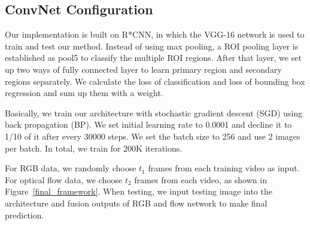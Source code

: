 \documentclass[10pt,twocolumn,letterpaper]{article}
\begin{document}
\subsection{ConvNet Configuration}
Our implementation is built on R*CNN, in which the VGG-16 network is used to train and test our method. Instead of using max pooling, a ROI pooling layer is established as pool5 to classify the multiple ROI regions. After that layer, we set up two ways of fully connected layer to learn primary region and secondary regions separately. We calculate the loss of classification and loss of bounding box regression and sum up them with a weight. 

Basically, we train our architecture with stochastic gradient descent (SGD) using back propagation (BP). We set initial learning rate to 0.0001 and decline it to 1/10 of it after every 30000 steps. We set the batch size to 256 and use 2 images per batch. In total, we train for 200K iterations. 

For RGB data, we randomly choose $t_{1}$ frames from each training video as input. For optical flow data, we choose $t_{2}$ frames from each video, as shown in Figure~\ref{final_framework}. When testing, we input testing image into the architecture and fusion outputs of RGB and flow network to make final prediction. 
\end{document}
